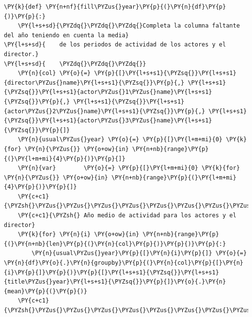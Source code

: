     \begin{tcolorbox}[breakable, size=fbox, boxrule=1pt, pad at break*=1mm,colback=cellbackground, colframe=cellborder]
\begin{Verbatim}[commandchars=\\\{\}]
\PY{k}{def} \PY{n+nf}{fill\PYZus{}year}\PY{p}{(}\PY{n}{df}\PY{p}{)}\PY{p}{:}
    \PY{l+s+sd}{\PYZdq{}\PYZdq{}\PYZdq{}Completa la columna faltante del año teniendo en cuenta la media}
\PY{l+s+sd}{    de los periodos de actividad de los actores y el director.}
\PY{l+s+sd}{    \PYZdq{}\PYZdq{}\PYZdq{}}
    \PY{n}{col} \PY{o}{=} \PY{p}{[}\PY{l+s+s1}{\PYZsq{}}\PY{l+s+s1}{director\PYZus{}name}\PY{l+s+s1}{\PYZsq{}}\PY{p}{,} \PY{l+s+s1}{\PYZsq{}}\PY{l+s+s1}{actor\PYZus{}1\PYZus{}name}\PY{l+s+s1}{\PYZsq{}}\PY{p}{,} \PY{l+s+s1}{\PYZsq{}}\PY{l+s+s1}{actor\PYZus{}2\PYZus{}name}\PY{l+s+s1}{\PYZsq{}}\PY{p}{,} \PY{l+s+s1}{\PYZsq{}}\PY{l+s+s1}{actor\PYZus{}3\PYZus{}name}\PY{l+s+s1}{\PYZsq{}}\PY{p}{]}
    \PY{n}{usual\PYZus{}year} \PY{o}{=} \PY{p}{[}\PY{l+m+mi}{0} \PY{k}{for} \PY{n}{\PYZus{}} \PY{o+ow}{in} \PY{n+nb}{range}\PY{p}{(}\PY{l+m+mi}{4}\PY{p}{)}\PY{p}{]}
    \PY{n}{var}        \PY{o}{=} \PY{p}{[}\PY{l+m+mi}{0} \PY{k}{for} \PY{n}{\PYZus{}} \PY{o+ow}{in} \PY{n+nb}{range}\PY{p}{(}\PY{l+m+mi}{4}\PY{p}{)}\PY{p}{]}
    \PY{c+c1}{\PYZsh{}\PYZus{}\PYZus{}\PYZus{}\PYZus{}\PYZus{}\PYZus{}\PYZus{}\PYZus{}\PYZus{}\PYZus{}\PYZus{}\PYZus{}\PYZus{}\PYZus{}\PYZus{}\PYZus{}\PYZus{}\PYZus{}\PYZus{}\PYZus{}\PYZus{}\PYZus{}\PYZus{}\PYZus{}\PYZus{}\PYZus{}\PYZus{}\PYZus{}\PYZus{}\PYZus{}\PYZus{}\PYZus{}\PYZus{}\PYZus{}\PYZus{}\PYZus{}\PYZus{}\PYZus{}\PYZus{}\PYZus{}\PYZus{}\PYZus{}\PYZus{}\PYZus{}\PYZus{}\PYZus{}\PYZus{}\PYZus{}\PYZus{}\PYZus{}\PYZus{}\PYZus{}\PYZus{}\PYZus{}\PYZus{}\PYZus{}\PYZus{}\PYZus{}\PYZus{}\PYZus{}\PYZus{}}
    \PY{c+c1}{\PYZsh{} Año medio de actividad para los actores y el director}
    \PY{k}{for} \PY{n}{i} \PY{o+ow}{in} \PY{n+nb}{range}\PY{p}{(}\PY{n+nb}{len}\PY{p}{(}\PY{n}{col}\PY{p}{)}\PY{p}{)}\PY{p}{:}
        \PY{n}{usual\PYZus{}year}\PY{p}{[}\PY{n}{i}\PY{p}{]} \PY{o}{=} \PY{n}{df}\PY{o}{.}\PY{n}{groupby}\PY{p}{(}\PY{n}{col}\PY{p}{[}\PY{n}{i}\PY{p}{]}\PY{p}{)}\PY{p}{[}\PY{l+s+s1}{\PYZsq{}}\PY{l+s+s1}{title\PYZus{}year}\PY{l+s+s1}{\PYZsq{}}\PY{p}{]}\PY{o}{.}\PY{n}{mean}\PY{p}{(}\PY{p}{)}
    \PY{c+c1}{\PYZsh{}\PYZus{}\PYZus{}\PYZus{}\PYZus{}\PYZus{}\PYZus{}\PYZus{}\PYZus{}\PYZus{}\PYZus{}\PYZus{}\PYZus{}\PYZus{}\PYZus{}\PYZus{}\PYZus{}\PYZus{}\PYZus{}\PYZus{}\PYZus{}\PYZus{}\PYZus{}\PYZus{}\PYZus{}\PYZus{}\PYZus{}\PYZus{}\PYZus{}\PYZus{}\PYZus{}\PYZus{}\PYZus{}\PYZus{}\PYZus{}\PYZus{}\PYZus{}\PYZus{}\PYZus{}\PYZus{}\PYZus{}\PYZus{}\PYZus{}\PYZus{}\PYZus{}\PYZus{}}

\end{Verbatim}
\end{tcolorbox}
